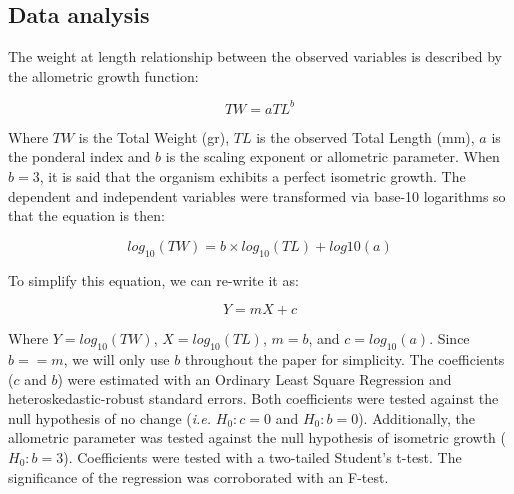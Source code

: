 \documentclass[12pt,]{article}
\begin{document}
\subsection{Data analysis}\label{data-analysis}

The weight at length relationship between the observed variables is
described by the allometric growth function:

\begin{equation}TW = aTL^b\end{equation}

Where \(TW\) is the Total Weight (gr), \(TL\) is the observed Total
Length (mm), \(a\) is the ponderal index and \(b\) is the scaling
exponent or allometric parameter. When \(b = 3\), it is said that the
organism exhibits a perfect isometric growth. The dependent and
independent variables were transformed via base-10 logarithms so that
the equation is then:

\begin{equation}log_{10}(TW) = b\times log_{10}(TL) + log{10}(a)\end{equation}

To simplify this equation, we can re-write it as:

\begin{equation}Y = mX + c\end{equation}

Where \(Y = log_{10}(TW)\), \(X = log_{10}(TL)\), \(m = b\), and
\(c = log_{10}(a)\). Since \(b == m\), we will only use \(b\) throughout
the paper for simplicity. The coefficients (\(c\) and \(b\)) were
estimated with an Ordinary Least Square Regression and
heteroskedastic-robust standard errors. Both coefficients were tested
against the null hypothesis of no change (\emph{i.e.} \(H_0: c = 0\) and
\(H_0: b = 0\)). Additionally, the allometric parameter was tested
against the null hypothesis of isometric growth (\(H_0: b = 3\)).
Coefficients were tested with a two-tailed Student's t-test. The
significance of the regression was corroborated with an F-test.
\end{document}
